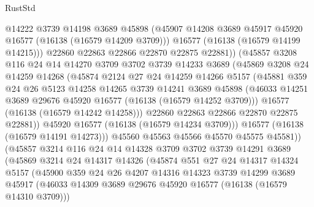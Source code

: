 \begin{lexlean}{RustStd}
\begin{coremodule}
                    @14222
                    @3739
                    @14198
                    @3689
                    @45898
                    (@45907 @14208 @3689 @45917 @45920 @16577 (@16138 (@16579 @14209 @3709)))
                    @16577
                    (@16138 (@16579 @14199 @14215)))
                  @22860
                  @22863
                  @22866
                  @22870
                  @22875
                  @22881))
              (@45857
                @3208
                @116
                @24
                @14
                @14270
                @3709
                @3702
                @3739
                @14233
                @3689
                (@45869
                  @3208
                  @24
                  @14259
                  @14268
                  (@45874
                    @2124
                    @27
                    @24
                    @14259
                    @14266
                    @5157
                    (@45881
                      @359
                      @24
                      @26
                      @5123
                      @14258
                      @14265
                      @3739
                      @14241
                      @3689
                      @45898
                      (@46033 @14251 @3689 @29676 @45920 @16577 (@16138 (@16579 @14252 @3709)))
                      @16577
                      (@16138 (@16579 @14242 @14258)))
                    @22860
                    @22863
                    @22866
                    @22870
                    @22875
                    @22881))
                @45920
                @16577
                (@16138 (@16579 @14234 @3709)))
              @16577
              (@16138 (@16579 @14191 @14273)))
            @45560
            @45563
            @45566
            @45570
            @45575
            @45581))
        (@45857
          @3214
          @116
          @24
          @14
          @14328
          @3709
          @3702
          @3739
          @14291
          @3689
          (@45869
            @3214
            @24
            @14317
            @14326
            (@45874
              @551
              @27
              @24
              @14317
              @14324
              @5157
              (@45900
                @359
                @24
                @26
                @4207
                @14316
                @14323
                @3739
                @14299
                @3689
                @45917
                (@46033 @14309 @3689 @29676 @45920 @16577 (@16138 (@16579 @14310 @3709)))

\end{coremodule}
\end{lexlean}
